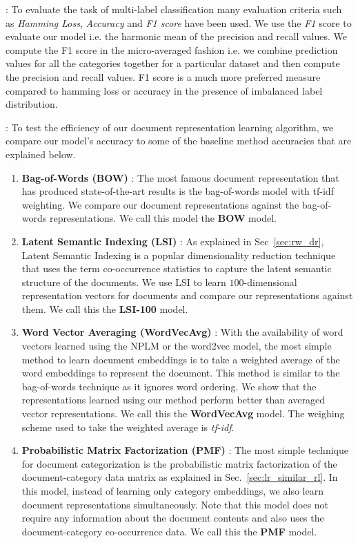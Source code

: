  : To evaluate the task of multi-label classification many evaluation criteria such as \emph{Hamming Loss}, \emph{Accuracy} and \emph{F1 score} have been used. We use the \emph{F1} score to evaluate our model i.e. the harmonic mean of the precision and recall values. We compute the F1 score in the micro-averaged fashion i.e. we combine prediction values for all the categories together for a particular dataset and then compute the precision and recall values. F1 score is a much more preferred measure compared to hamming loss or accuracy in the presence of imbalanced label distribution.

 : To test the efficiency of our document representation learning algorithm, we compare our model's accuracy to some of the baseline method accuracies that are explained below.
\begin{enumerate}
\item \textbf{Bag-of-Words (BOW)} : 
The most famous document representation that has produced state-of-the-art results is the bag-of-words model with tf-idf weighting. We compare our document representations against the bag-of-words representations. We call this model the \textbf{BOW} model.

\item \textbf{Latent Semantic Indexing (LSI)} : 
As explained in Sec~\ref{sec:rw_dr}, Latent Semantic Indexing is a popular dimensionality reduction technique that uses the term co-occurrence statistics to capture the latent semantic structure of the documents. We use LSI to learn $100$-dimensional representation vectors for documents and compare our representations against them.
We call this the \textbf{LSI-100} model.

\item \textbf{Word Vector Averaging (WordVecAvg)} : 
With the availability of word vectors learned using the NPLM or the word2vec model, the most simple method to learn document embeddings is to take a weighted average of the word embeddings to represent the document. This method is similar to the bag-of-words technique as it ignores word ordering. We show that the representations learned using our method perform better than averaged vector representations. We call this the \textbf{WordVecAvg} model. The weighing scheme used to take the weighted average is \emph{tf-idf}.

\item \textbf{Probabilistic Matrix Factorization (PMF)} : 
The most simple technique for document categorization is the probabilistic matrix factorization of the document-category data matrix as explained in Sec.~\ref{sec:lr_similar_rl}. In this model, instead of learning only category embeddings, we also learn document representations simultaneously. Note that this model does not require any information about the document contents and also uses the document-category co-occurrence data. We call this the \textbf{PMF} model.


\end{enumerate}
